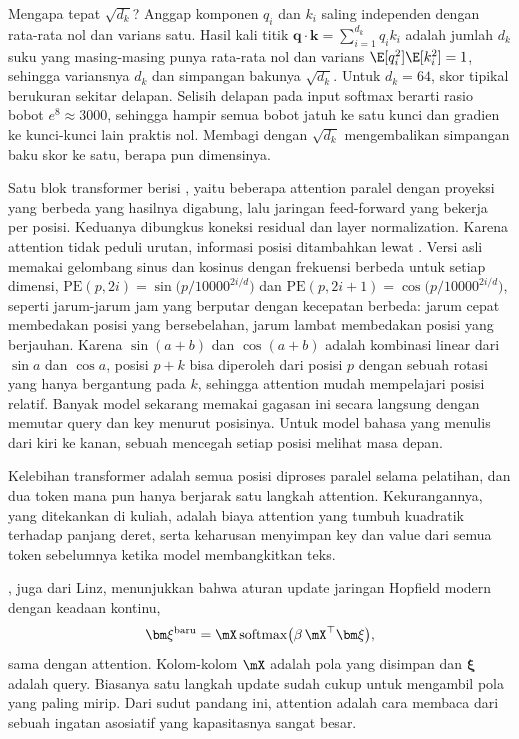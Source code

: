 Mengapa tepat $\sqrt{d_k}$? Anggap komponen $q_i$ dan $k_i$ saling independen dengan rata-rata nol dan
varians satu. Hasil kali titik $\bm q\cdot\bm k=\sum_{i=1}^{d_k}q_ik_i$ adalah jumlah $d_k$ suku yang
masing-masing punya rata-rata nol dan varians $\E[q_i^2]\E[k_i^2]=1$, sehingga variansnya $d_k$ dan
simpangan bakunya $\sqrt{d_k}$. Untuk $d_k=64$, skor tipikal berukuran sekitar delapan. Selisih delapan
pada input softmax berarti rasio bobot $e^8\approx3000$, sehingga hampir semua bobot jatuh ke satu kunci
dan gradien ke kunci-kunci lain praktis nol. Membagi dengan $\sqrt{d_k}$ mengembalikan simpangan baku skor
ke satu, berapa pun dimensinya.

Satu blok transformer berisi , yaitu beberapa attention paralel dengan
proyeksi yang berbeda yang hasilnya digabung, lalu jaringan feed-forward yang bekerja per posisi.
Keduanya dibungkus koneksi residual dan layer normalization. Karena attention tidak peduli urutan,
informasi posisi ditambahkan lewat . Versi asli memakai gelombang sinus dan kosinus
dengan frekuensi berbeda untuk setiap dimensi,
$\mathrm{PE}(p,2i)=\sin\big(p/10000^{2i/d}\big)$ dan $\mathrm{PE}(p,2i+1)=\cos\big(p/10000^{2i/d}\big)$, seperti jarum-jarum
jam yang berputar dengan kecepatan berbeda: jarum cepat membedakan posisi yang bersebelahan, jarum lambat membedakan
posisi yang berjauhan. Karena $\sin(a+b)$ dan $\cos(a+b)$ adalah kombinasi linear dari $\sin a$ dan $\cos a$, posisi
$p+k$ bisa diperoleh dari posisi $p$ dengan sebuah rotasi yang hanya bergantung pada $k$, sehingga attention mudah
mempelajari posisi relatif. Banyak model sekarang memakai gagasan ini secara langsung dengan memutar query dan key
menurut posisinya. Untuk model bahasa yang menulis dari
kiri ke kanan, sebuah  mencegah setiap posisi melihat masa depan.

Kelebihan transformer adalah semua posisi diproses paralel selama pelatihan, dan dua token
mana pun hanya berjarak satu langkah attention. Kekurangannya, yang ditekankan di kuliah, adalah
biaya attention yang tumbuh kuadratik terhadap panjang deret, serta keharusan menyimpan key dan
value dari semua token sebelumnya ketika model membangkitkan teks.

\citet{ramsauer2021}, juga dari Linz, menunjukkan bahwa aturan update jaringan Hopfield modern
dengan keadaan kontinu,
\begin{equation}
\bm\xi^{\mathrm{baru}}=\mX\,\mathrm{softmax}\big(\beta\,\mX^\top\bm\xi\big),
\end{equation}
sama dengan attention. Kolom-kolom $\mX$ adalah pola yang disimpan dan $\bm\xi$ adalah query.
Biasanya satu langkah update sudah cukup untuk mengambil pola yang paling mirip. Dari sudut
pandang ini, attention adalah cara membaca dari sebuah ingatan asosiatif yang kapasitasnya sangat
besar.

